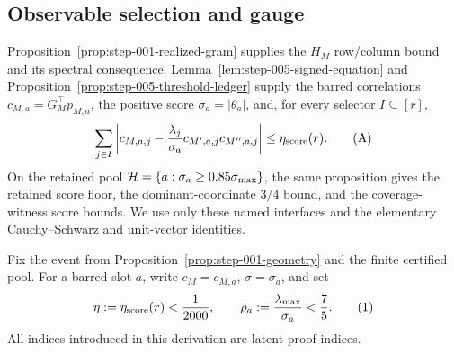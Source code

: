 \subsection{Observable selection and gauge}\label{app:step-006}

Proposition~\ref{prop:step-001-realized-gram} supplies the $H_M$ row/column
bound and its spectral consequence. Lemma~\ref{lem:step-005-signed-equation}
and Proposition~\ref{prop:step-005-threshold-ledger} supply the barred
correlations $c_{M,a}=G_M^\top\bar p_{M,a}$, the positive score
$\sigma_a=|\theta_a|$, and, for every selector $I\subseteq[r]$,
\[
\sum_{j\in I}\left|c_{M,a,j}
-\frac{\lambda_j}{\sigma_a}c_{M',a,j}c_{M'',a,j}\right|
\le\eta_{\rm score}(r).
\tag{A}
\]
On the retained pool ${\cal H}=\{a:\sigma_a\ge0.85\sigma_{\max}\}$, the
same proposition gives the retained score floor, the dominant-coordinate
$3/4$ bound, and the coverage-witness score bounds. We use only these named
interfaces and the elementary Cauchy--Schwarz and unit-vector identities.

Fix the event from Proposition~\ref{prop:step-001-geometry} and the finite certified pool. For a barred slot
\(a\), write \(c_M=c_{M,a}\), \(\sigma=\sigma_a\), and set
\[
 \eta:=\eta_{\rm score}(r)<{1\over2000},\qquad
 \rho_a:={\lambda_{\max}\over\sigma_a}<{7\over5}. \tag{1}
\]
All indices introduced in this derivation are latent proof indices.


